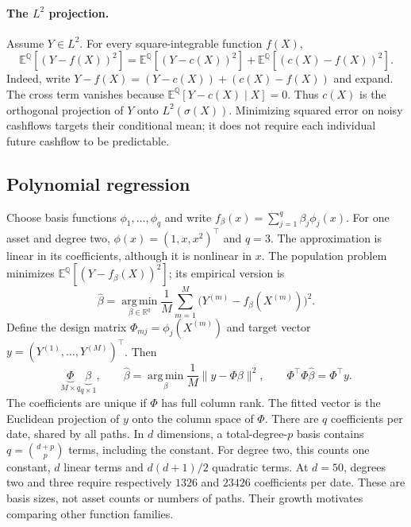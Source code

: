 \documentclass[11pt,a4paper]{article}
\newcommand{\E}{\mathbb E^{\mathbb Q}}
\newcommand{\R}{\mathbb R}
\newcommand{\argmin}{\operatorname*{arg\,min}}
\begin{document}
\paragraph{The $L^2$ projection.}
Assume $Y\in L^2$. For every square-integrable function $f(X)$,
\begin{equation}\label{eq:projection}
 \E[(Y-f(X))^2]
 =\E[(Y-c(X))^2]+\E[(c(X)-f(X))^2].
\end{equation}
Indeed, write $Y-f(X)=(Y-c(X))+(c(X)-f(X))$ and expand.
The cross term vanishes because $\E[Y-c(X)\mid X]=0$.
Thus $c(X)$ is the orthogonal projection of $Y$ onto $L^2(\sigma(X))$.
Minimizing squared error on noisy cashflows targets their conditional mean;
it does not require each individual future cashflow to be predictable.

\subsection{Polynomial regression}
Choose basis functions $\phi_1,\ldots,\phi_q$ and write
$f_\beta(x)=\sum_{j=1}^q\beta_j\phi_j(x)$.
For one asset and degree two, $\phi(x)=(1,x,x^2)^\top$ and $q=3$.
The approximation is linear in its coefficients, although it is nonlinear in $x$.
The population problem minimizes $\E[(Y-f_\beta(X))^2]$; its empirical version is
\begin{equation}
 \widehat\beta=\argmin_{\beta\in\R^q}\frac1M
 \sum_{m=1}^M\bigl(Y^{(m)}-f_\beta(X^{(m)})\bigr)^2.
\end{equation}
Define the design matrix $\Phi_{mj}=\phi_j(X^{(m)})$ and target vector
$y=(Y^{(1)},\ldots,Y^{(M)})^\top$. Then
\begin{equation}\label{eq:normal}
 \underbrace{\Phi}_{M\times q}\underbrace{\beta}_{q\times1},\qquad
 \widehat\beta=\argmin_\beta\frac1M\|y-\Phi\beta\|^2,
 \qquad \Phi^\top\Phi\widehat\beta=\Phi^\top y.
\end{equation}
The coefficients are unique if $\Phi$ has full column rank. The fitted vector
is the Euclidean projection of $y$ onto the column space of $\Phi$.
There are $q$ coefficients per date, shared by all paths. In $d$ dimensions,
a total-degree-$p$ basis contains $q=\binom{d+p}{p}$ terms, including the constant.
For degree two, this counts one constant, $d$ linear terms and $d(d+1)/2$
quadratic terms. At $d=50$, degrees two and three require respectively $1326$
and $23426$ coefficients per date. These are basis sizes, not asset counts or
numbers of paths. Their growth motivates comparing other function families.
\end{document}
